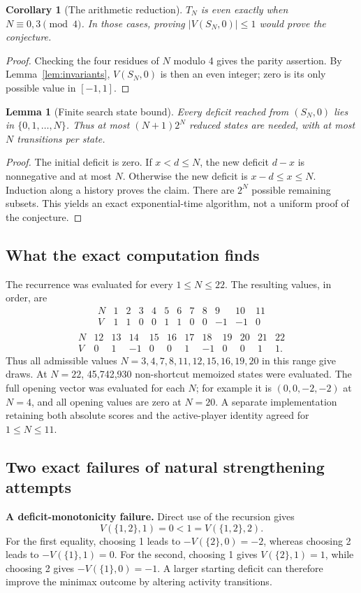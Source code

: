 \documentclass[11pt,a4paper]{article}
\newtheorem{lemma}[theorem]{Lemma}
\newtheorem{corollary}[theorem]{Corollary}
\theoremstyle{definition}\newtheorem{definition}[theorem]{Definition}
\theoremstyle{remark}\newtheorem{remark}[theorem]{Remark}
\newcommand{\1}{\mathbf 1}
\begin{document}
\begin{corollary}[The arithmetic reduction]
$T_N$ is even exactly when $N\equiv0,3\pmod4$. In those cases, proving $|V(S_N,0)|\le1$ would prove the conjecture.
\end{corollary}
\begin{proof}
Checking the four residues of $N$ modulo 4 gives the parity assertion. By Lemma~\ref{lem:invariants}, $V(S_N,0)$ is then an even integer; zero is its only possible value in $[-1,1]$.
\end{proof}

\begin{lemma}[Finite search state bound]
Every deficit reached from $(S_N,0)$ lies in $\{0,1,\ldots,N\}$. Thus at most $(N+1)2^N$ reduced states are needed, with at most $N$ transitions per state.
\end{lemma}
\begin{proof}
The initial deficit is zero. If $x<d\le N$, the new deficit $d-x$ is nonnegative and at most $N$. Otherwise the new deficit is $x-d\le x\le N$. Induction along a history proves the claim. There are $2^N$ possible remaining subsets. This yields an exact exponential-time algorithm, not a uniform proof of the conjecture.
\end{proof}

\subsection{What the exact computation finds}
The recurrence was evaluated for every $1\le N\le22$. The resulting values, in order, are
\[
\begin{array}{c|rrrrrrrrrrr}
N&1&2&3&4&5&6&7&8&9&10&11\\\hline
V&1&1&0&0&1&1&0&0&-1&-1&0\\
\end{array}
\]
\[
\begin{array}{c|rrrrrrrrrrr}
N&12&13&14&15&16&17&18&19&20&21&22\\\hline
V&0&1&-1&0&0&1&-1&0&0&1&1.
\end{array}
\]
Thus all admissible values $N=3,4,7,8,11,12,15,16,19,20$ in this range give draws. At $N=22$, 45,742,930 non-shortcut memoized states were evaluated. The full opening vector was evaluated for each $N$; for example it is $(0,0,-2,-2)$ at $N=4$, and all opening values are zero at $N=20$. A separate implementation retaining both absolute scores and the active-player identity agreed for $1\le N\le11$.

\subsection{Two exact failures of natural strengthening attempts}
\textbf{A deficit-monotonicity failure.} Direct use of the recursion gives
\[
 V(\{1,2\},1)=0<1=V(\{1,2\},2).
\]
For the first equality, choosing 1 leads to $-V(\{2\},0)=-2$, whereas choosing 2 leads to $-V(\{1\},1)=0$. For the second, choosing 1 gives $V(\{2\},1)=1$, while choosing 2 gives $-V(\{1\},0)=-1$. A larger starting deficit can therefore improve the minimax outcome by altering activity transitions.
\end{document}
